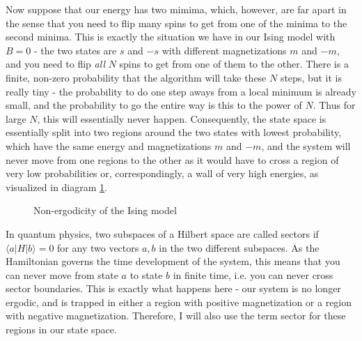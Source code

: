 \documentclass[a4paper, draft]{article}
\theoremstyle{own}
\theoremstyle{remark}
\begin{document}
Now suppose that our energy has two mimima, which, however, are far apart in the sense that you need to flip many spins to get from one of the minima to the second minima. This is exactly the situation we have in our Ising model with $B = 0$ - the two states are $s$ and $-s$ with different magnetizations $m$ and $-m$, and you need to flip {\em all} $N$ spins to get from one of them to the other. There is a finite, non-zero probability that the algorithm will take these $N$ steps, but it is really tiny - the probability to do one step aways from a local minimum is already small, and the probability to go the entire way is this to the power of $N$.  Thus for large $N$, this will essentially never happen. Consequently, the state space is essentially split into two regions around the two states with lowest probability, which have the same energy and magnetizations $m$ and $-m$, and the system will never move from one regions to the other as it would have to cross a region of very low probabilities or, correspondingly, a wall of very high energies, as visualized in diagram \ref{fig:Domains}.


\begin{figure}[ht]
	\begin{center}
	\end{center}
	\caption{Non-ergodicity of the Ising model}
	\label{fig:Domains}
\end{figure}


In quantum physics, two subspaces of a Hilbert space are called sectors if $\langle a | H | b \rangle = 0$ for any two vectors $a, b$ in the two different subspaces. As the Hamiltonian governs the time development of the system, this means that you can never move from state $a$ to state $b$ in finite time, i.e. you can never cross sector boundaries. This is exactly what happens here - our system is no longer ergodic, and is trapped in either a region with positive magnetization or a region with negative magnetization. Therefore, I will also use the term sector for these regions in our state space.
\end{document}
